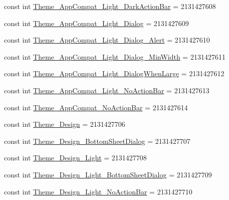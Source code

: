 \begin{DoxyCompactItemize}
const int \mbox{\hyperlink{class_f_w_p_s___app_1_1_droid_1_1_resource_1_1_style_a84acec76dffe6a76ad9f40aaf9c1e058}{Theme\+\_\+\+App\+Compat\+\_\+\+Light\+\_\+\+Dark\+Action\+Bar}} = 2131427608
\item 
const int \mbox{\hyperlink{class_f_w_p_s___app_1_1_droid_1_1_resource_1_1_style_a0b261d04e337faa298bc05c7553484e4}{Theme\+\_\+\+App\+Compat\+\_\+\+Light\+\_\+\+Dialog}} = 2131427609
\item 
const int \mbox{\hyperlink{class_f_w_p_s___app_1_1_droid_1_1_resource_1_1_style_a95dbe5f45775ef23533460ec406a3182}{Theme\+\_\+\+App\+Compat\+\_\+\+Light\+\_\+\+Dialog\+\_\+\+Alert}} = 2131427610
\item 
const int \mbox{\hyperlink{class_f_w_p_s___app_1_1_droid_1_1_resource_1_1_style_a995cee0233437d2715ccd087af826135}{Theme\+\_\+\+App\+Compat\+\_\+\+Light\+\_\+\+Dialog\+\_\+\+Min\+Width}} = 2131427611
\item 
const int \mbox{\hyperlink{class_f_w_p_s___app_1_1_droid_1_1_resource_1_1_style_afb597a40a3898894443655f81bf1e910}{Theme\+\_\+\+App\+Compat\+\_\+\+Light\+\_\+\+Dialog\+When\+Large}} = 2131427612
\item 
const int \mbox{\hyperlink{class_f_w_p_s___app_1_1_droid_1_1_resource_1_1_style_a0e39aea615ad70713426bed8c4f2fd42}{Theme\+\_\+\+App\+Compat\+\_\+\+Light\+\_\+\+No\+Action\+Bar}} = 2131427613
\item 
const int \mbox{\hyperlink{class_f_w_p_s___app_1_1_droid_1_1_resource_1_1_style_a1e92d3f19dd43c8ab1ee48cd621dbec9}{Theme\+\_\+\+App\+Compat\+\_\+\+No\+Action\+Bar}} = 2131427614
\item 
const int \mbox{\hyperlink{class_f_w_p_s___app_1_1_droid_1_1_resource_1_1_style_a354ca582cc4bce49a57c94ced2587264}{Theme\+\_\+\+Design}} = 2131427706
\item 
const int \mbox{\hyperlink{class_f_w_p_s___app_1_1_droid_1_1_resource_1_1_style_a988dd7c7bc06f68a059a6ab20a329670}{Theme\+\_\+\+Design\+\_\+\+Bottom\+Sheet\+Dialog}} = 2131427707
\item 
const int \mbox{\hyperlink{class_f_w_p_s___app_1_1_droid_1_1_resource_1_1_style_a0de9c73179340d4a4dabec11f41055e4}{Theme\+\_\+\+Design\+\_\+\+Light}} = 2131427708
\item 
const int \mbox{\hyperlink{class_f_w_p_s___app_1_1_droid_1_1_resource_1_1_style_a3f076c1cd1699c32d1de3b2321adb0e2}{Theme\+\_\+\+Design\+\_\+\+Light\+\_\+\+Bottom\+Sheet\+Dialog}} = 2131427709
\item 
const int \mbox{\hyperlink{class_f_w_p_s___app_1_1_droid_1_1_resource_1_1_style_a6bbd0f16492e1efcfe80d32340b9bec4}{Theme\+\_\+\+Design\+\_\+\+Light\+\_\+\+No\+Action\+Bar}} = 2131427710

\end{DoxyCompactItemize}
